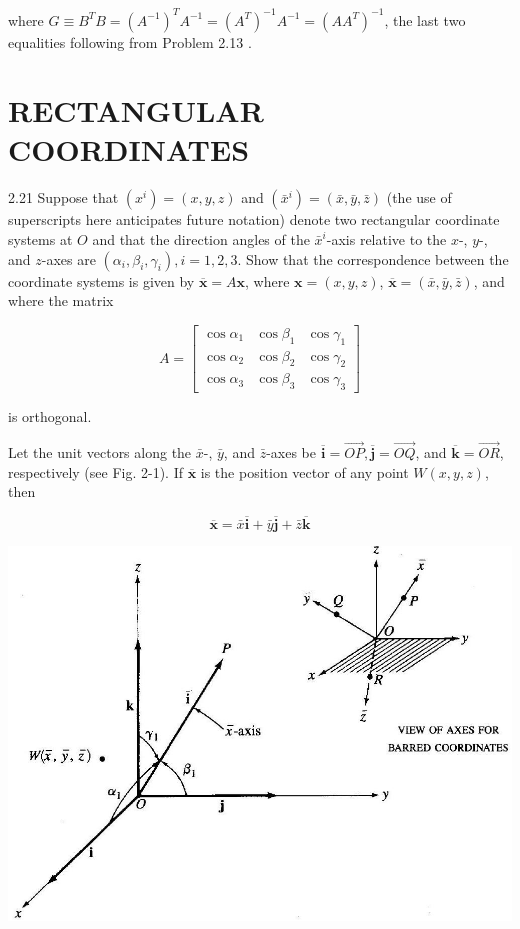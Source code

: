 \documentclass[10pt]{article}
\begin{document}
where $G \equiv B^{T} B=\left(A^{-1}\right)^{T} A^{-1}=\left(A^{T}\right)^{-1} A^{-1}=\left(A A^{T}\right)^{-1}$, the last two equalities following from Problem 2.13 .

\section*{RECTANGULAR COORDINATES}
2.21 Suppose that $\left(x^{i}\right)=(x, y, z)$ and $\left(\bar{x}^{i}\right)=(\bar{x}, \bar{y}, \bar{z})$ (the use of superscripts here anticipates future notation) denote two rectangular coordinate systems at $O$ and that the direction angles of the $\bar{x}^{i}$-axis relative to the $x$-, $y$-, and $z$-axes are $\left(\alpha_{i}, \beta_{i}, \gamma_{i}\right), i=1,2,3$. Show that the correspondence between the coordinate systems is given by $\overline{\mathbf{x}}=A \mathbf{x}$, where $\mathbf{x}=(x, y, z)$, $\overline{\mathbf{x}}=(\bar{x}, \bar{y}, \bar{z})$, and where the matrix

$$
A=\left[\begin{array}{lll}
\cos \alpha_{1} & \cos \beta_{1} & \cos \gamma_{1} \\
\cos \alpha_{2} & \cos \beta_{2} & \cos \gamma_{2} \\
\cos \alpha_{3} & \cos \beta_{3} & \cos \gamma_{3}
\end{array}\right]
$$

is orthogonal.

Let the unit vectors along the $\bar{x}$-, $\bar{y}$, and $\bar{z}$-axes be $\overline{\mathbf{i}}=\overrightarrow{O P}, \overline{\mathbf{j}}=\overrightarrow{O Q}$, and $\overline{\mathbf{k}}=\overrightarrow{O R}$, respectively (see Fig. 2-1). If $\overline{\mathbf{x}}$ is the position vector of any point $W(x, y, z)$, then

$$
\overline{\mathbf{x}}=\bar{x} \overline{\mathbf{i}}+\bar{y} \overline{\mathbf{j}}+\bar{z} \overline{\mathbf{k}}
$$

\begin{center}
\includegraphics[max width=\textwidth]{2024_04_03_41f90be4f896e21f0dc9g-028}
\end{center}
\end{document}
